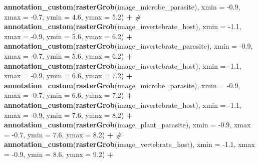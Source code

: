 \documentclass[
]{article}
\newenvironment{Shaded}{\begin{snugshade}}{\end{snugshade}}
\newcommand{\CommentTok}[1]{\textcolor[rgb]{0.56,0.35,0.01}{\textit{#1}}}
\newcommand{\DataTypeTok}[1]{\textcolor[rgb]{0.13,0.29,0.53}{#1}}
\newcommand{\FloatTok}[1]{\textcolor[rgb]{0.00,0.00,0.81}{#1}}
\newcommand{\KeywordTok}[1]{\textcolor[rgb]{0.13,0.29,0.53}{\textbf{#1}}}
\newcommand{\NormalTok}[1]{#1}
\newcommand{\OperatorTok}[1]{\textcolor[rgb]{0.81,0.36,0.00}{\textbf{#1}}}
\newcommand{\StringTok}[1]{\textcolor[rgb]{0.31,0.60,0.02}{#1}}
\begin{document}
\begin{Shaded}
\begin{Highlighting}[]
{{{{{\StringTok{  }\KeywordTok{annotation_custom}\NormalTok{(}\KeywordTok{rasterGrob}\NormalTok{(image_microbe_parasite), }\DataTypeTok{xmin =} \FloatTok{-0.9}\NormalTok{, }\DataTypeTok{xmax =} \FloatTok{-0.7}\NormalTok{, }\DataTypeTok{ymin =} \FloatTok{4.6}\NormalTok{, }\DataTypeTok{ymax =} \FloatTok{5.2}\NormalTok{) }\OperatorTok{+}
\StringTok{  }\CommentTok{#}
\StringTok{  }\KeywordTok{annotation_custom}\NormalTok{(}\KeywordTok{rasterGrob}\NormalTok{(image_invertebrate_host), }\DataTypeTok{xmin =} \FloatTok{-1.1}\NormalTok{, }\DataTypeTok{xmax =} \FloatTok{-0.9}\NormalTok{, }\DataTypeTok{ymin =} \FloatTok{5.6}\NormalTok{, }\DataTypeTok{ymax =} \FloatTok{6.2}\NormalTok{) }\OperatorTok{+}\StringTok{ }
\StringTok{  }\KeywordTok{annotation_custom}\NormalTok{(}\KeywordTok{rasterGrob}\NormalTok{(image_invertebrate_parasite), }\DataTypeTok{xmin =} \FloatTok{-0.9}\NormalTok{, }\DataTypeTok{xmax =} \FloatTok{-0.7}\NormalTok{, }\DataTypeTok{ymin =} \FloatTok{5.6}\NormalTok{, }\DataTypeTok{ymax =} \FloatTok{6.2}\NormalTok{) }\OperatorTok{+}\StringTok{ }
\StringTok{  }\KeywordTok{annotation_custom}\NormalTok{(}\KeywordTok{rasterGrob}\NormalTok{(image_invertebrate_host), }\DataTypeTok{xmin =} \FloatTok{-1.1}\NormalTok{, }\DataTypeTok{xmax =} \FloatTok{-0.9}\NormalTok{, }\DataTypeTok{ymin =} \FloatTok{6.6}\NormalTok{, }\DataTypeTok{ymax =} \FloatTok{7.2}\NormalTok{) }\OperatorTok{+}
\StringTok{  }\KeywordTok{annotation_custom}\NormalTok{(}\KeywordTok{rasterGrob}\NormalTok{(image_microbe_parasite), }\DataTypeTok{xmin =} \FloatTok{-0.9}\NormalTok{, }\DataTypeTok{xmax =} \FloatTok{-0.7}\NormalTok{, }\DataTypeTok{ymin =} \FloatTok{6.6}\NormalTok{, }\DataTypeTok{ymax =} \FloatTok{7.2}\NormalTok{) }\OperatorTok{+}
\StringTok{  }\KeywordTok{annotation_custom}\NormalTok{(}\KeywordTok{rasterGrob}\NormalTok{(image_invertebrate_host), }\DataTypeTok{xmin =} \FloatTok{-1.1}\NormalTok{, }\DataTypeTok{xmax =} \FloatTok{-0.9}\NormalTok{, }\DataTypeTok{ymin =} \FloatTok{7.6}\NormalTok{, }\DataTypeTok{ymax =} \FloatTok{8.2}\NormalTok{) }\OperatorTok{+}
\StringTok{  }\KeywordTok{annotation_custom}\NormalTok{(}\KeywordTok{rasterGrob}\NormalTok{(image_plant_parasite), }\DataTypeTok{xmin =} \FloatTok{-0.9}\NormalTok{, }\DataTypeTok{xmax =} \FloatTok{-0.7}\NormalTok{, }\DataTypeTok{ymin =} \FloatTok{7.6}\NormalTok{, }\DataTypeTok{ymax =} \FloatTok{8.2}\NormalTok{) }\OperatorTok{+}
\StringTok{  }\CommentTok{#}
\StringTok{  }\KeywordTok{annotation_custom}\NormalTok{(}\KeywordTok{rasterGrob}\NormalTok{(image_vertebrate_host), }\DataTypeTok{xmin =} \FloatTok{-1.1}\NormalTok{, }\DataTypeTok{xmax =} \FloatTok{-0.9}\NormalTok{, }\DataTypeTok{ymin =} \FloatTok{8.6}\NormalTok{, }\DataTypeTok{ymax =} \FloatTok{9.2}\NormalTok{) }\OperatorTok{+}\StringTok{ }
}}}}}
\end{Highlighting}
\end{Shaded}
\end{document}
